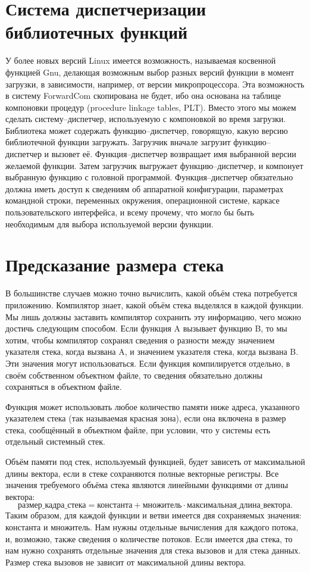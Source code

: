 \documentclass[forwardcom.tex]{subfiles}
\begin{document}
\section{Система диспетчеризации библиотечных функций} \label{libraryFunctionDispatchSystem}
У более новых версий Linux имеется возможность, называемая косвенной функцией Gnu, делающая возможным выбор разных версий функции в момент загрузки, в зависимости, например, от версии микропроцессора. Эта возможность в систему ForwardCom скопирована не будет, ибо она основана на таблице компоновки процедур (procedure linkage tables, PLT). Вместо этого мы можем сделать систему--диспетчер, используемую с компоновкой во время загрузки. Библиотека может содержать функцию--диспетчер, говорящую, какую версию библиотечной функции загружать. Загрузчик вначале загрузит функцию--диспетчер и вызовет её. Функция--диспетчер возвращает имя выбранной версии желаемой функции. Затем загрузчик выгружает функцию--диспетчер, и компонует выбранную функцию с головной программой. Функция--диспетчер обязательно должна иметь доступ к сведениям об аппаратной конфигурации, параметрах командной строки, переменных окружения, операционной системе, каркасе пользовательского интерфейса, и всему прочему, что могло бы быть необходимым для выбора используемой версии функции.

\section{Предсказание размера стека} \label{predictingStackSize}
В большинстве случаев можно точно вычислить, какой объём стека потребуется приложению. Компилятор знает, какой объём стека выделялся в каждой функции. Мы лишь должны заставить компилятор сохранить эту информацию, чего можно достичь следующим способом. Если функция A вызывает функцию B, то мы хотим, чтобы компилятор сохранял сведения о разности между значением указателя стека, когда вызвана A, и значением указателя стека, когда вызвана B. Эти значения могут использоваться. Если функция компилируется отдельно, в своём собственном объектном файле, то сведения обязательно должны сохраняться в объектном файле.

Функция может использовать любое количество памяти ниже адреса, указанного указателем стека (так называемая \glqq красная зона\grqq), если она включена в размер стека, сообщённый в объектном файле, при условии, что у системы есть отдельный системный стек.

Объём памяти под стек, используемый функцией, будет зависеть от максимальной длины вектора, если в стеке сохраняются полные векторные регистры. Все значения требуемого объёма стека являются линейными функциями от длины вектора:
$$
\text{размер_кадра_стека}=\text{константа} + \text{множитель}\cdot\text{максимальная_длина_вектора}.
$$
Таким образом, для каждой функции и ветви имеется двя сохраняемых значения: $\text{константа}$ и $\text{множитель}$. Нам нужны отдельные вычисления для каждого потока, и, возможно, также сведения о количестве потоков. Если имеется два стека, то нам нужно сохранять отдельные значения для стека вызовов и для стека данных. Размер стека вызовов не зависит от максимальной длины вектора.
\end{document}
